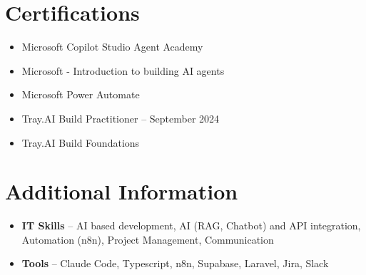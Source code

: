 \documentclass[a4paper,10pt]{article}
\begin{document}
\section{Certifications}
\begin{itemize}
\item Microsoft Copilot Studio Agent Academy
\item Microsoft - Introduction to building AI agents
\item Microsoft Power Automate
\item Tray.AI Build Practitioner -- September 2024
\item Tray.AI Build Foundations
\end{itemize}

\section{Additional Information}
\begin{itemize}
\item \textbf{IT Skills} -- AI based development, AI (RAG, Chatbot) and API integration, Automation (n8n), Project Management, Communication
\item \textbf{Tools} -- Claude Code, Typescript, n8n, Supabase, Laravel, Jira, Slack
\end{itemize}
\end{document}
